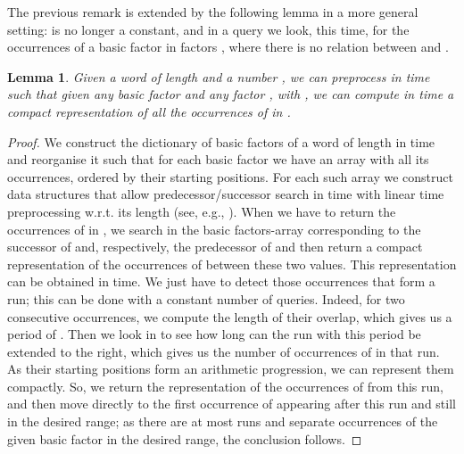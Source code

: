 \documentclass[final]{dmtcs-episciences}
\newtheorem{lemma}{Lemma}
\begin{document}
The previous remark is extended by the following lemma in a more general setting:  is no longer a constant, and in a query we look, this time, for the occurrences of a basic factor  in factors , where there is no relation between  and . 
\begin{lemma}\label{find_occ_range}
Given a word  of length  and a number , we can preprocess  in time  such that given any basic factor  and any factor , with , we can compute in  time a compact representation of all the occurrences of  in .
\end{lemma}
\begin{proof}
We construct the dictionary of basic factors of a word of length  in  time and reorganise it such that for each basic factor we have an array with all its occurrences, ordered by their starting positions. For each such array we construct data structures that allow predecessor/successor search in  time with linear time preprocessing w.r.t. its length (see, e.g., \cite{Boas75}). When we have to return the occurrences of  in , we search in the basic factors-array corresponding to  the successor of  and, respectively, the predecessor of  and then return a compact representation of the occurrences of  between these two values. This representation can be obtained in  time. We just have to detect those occurrences that form a run; this can be done with a constant number of  queries. Indeed, for two consecutive occurrences, we compute the length of their overlap, which gives us a period of . Then we look in  to see how long can the run with this period be extended to the right, which gives us the number of occurrences of   in that run. As their starting positions form an arithmetic progression, we can represent them compactly. So, we return the representation of the occurrences of  from this run, and then move directly to the first occurrence of  appearing after this run and still in the desired range; as there are at most  runs and separate occurrences of the given basic factor in the desired range, the conclusion follows.
\end{proof}
\end{document}

